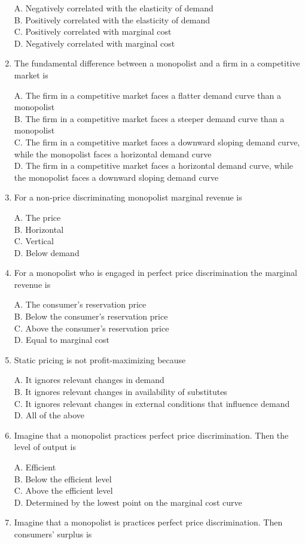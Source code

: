 \documentclass[
]{book}
\begin{document}
\begin{enumerate}
  A. Negatively correlated with the elasticity of demand\\
  B. Positively correlated with the elasticity of demand\\
  C. Positively correlated with marginal cost\\
  D. Negatively correlated with marginal cost
\item
  The fundamental difference between a monopolist and a firm in a competitive market is

  A. The firm in a competitive market faces a flatter demand curve than a monopolist\\
  B. The firm in a competitive market faces a steeper demand curve than a monopolist\\
  C. The firm in a competitive market faces a downward sloping demand curve, while the monopolist faces a horizontal demand curve\\
  D. The firm in a competitive market faces a horizontal demand curve, while the monopolist faces a downward sloping demand curve
\item
  For a non-price discriminating monopolist marginal revenue is

  A. The price\\
  B. Horizontal\\
  C. Vertical\\
  D. Below demand
\item
  For a monopolist who is engaged in perfect price discrimination the marginal revenue is

  A. The consumer's reservation price\\
  B. Below the consumer's reservation price\\
  C. Above the consumer's reservation price\\
  D. Equal to marginal cost
\item
  Static pricing is not profit-maximizing because

  A. It ignores relevant changes in demand\\
  B. It ignores relevant changes in availability of substitutes\\
  C. It ignores relevant changes in external conditions that influence demand\\
  D. All of the above
\item
  Imagine that a monopolist practices perfect price discrimination. Then the level of output is

  A. Efficient\\
  B. Below the efficient level\\
  C. Above the efficient level\\
  D. Determined by the lowest point on the marginal cost curve
\item
  Imagine that a monopolist is practices perfect price discrimination. Then consumers' surplus is


\end{enumerate}
\end{document}
